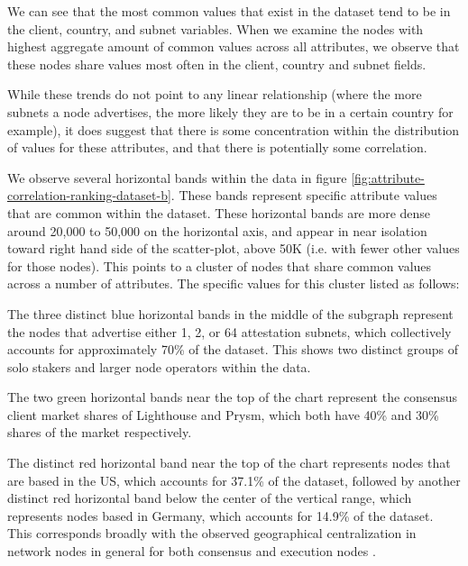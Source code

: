 \documentclass[conference]{IEEEtran}
\begin{document}
We can see that the most common values that exist in the dataset tend to be in the client, country, and subnet variables.  When we examine the nodes with highest aggregate amount of common values across all attributes, we observe that these nodes share values most often in the client, country and subnet fields.

While these trends do not point to any linear relationship (where the more subnets a node advertises, the more likely they are to be in a certain country for example), it does suggest that there is some concentration within the distribution of values for these attributes, and that there is potentially some correlation.


We observe several horizontal bands within the data in figure \ref{fig:attribute-correlation-ranking-dataset-b}.  These bands represent specific attribute values that are common within the dataset.  These horizontal bands are more dense around 20,000 to 50,000 on the horizontal axis, and appear in near isolation toward right hand side of the scatter-plot, above 50K (i.e. with fewer other values for those nodes).  This points to a cluster of nodes that share common values across a number of attributes.  The specific values for this cluster listed as follows:

The three distinct blue horizontal bands in the middle of the subgraph represent the nodes that advertise either 1, 2, or 64 attestation subnets, which collectively accounts for approximately 70\% of the dataset. This shows two distinct groups of solo stakers and larger node operators within the data.

The two green horizontal bands near the top of the chart represent the consensus client market shares of Lighthouse and Prysm, which both have 40\% and 30\% shares of the market respectively.

The distinct red horizontal band near the top of the chart represents nodes that are based in the US, which accounts for 37.1\% of the dataset, followed by another distinct red horizontal band below the center of the vertical range, which represents nodes based in Germany, which accounts for 14.9\% of the dataset.  This corresponds broadly with the observed geographical centralization in network nodes in general for both consensus and execution nodes \cite{nodewatch2024}.
\end{document}
